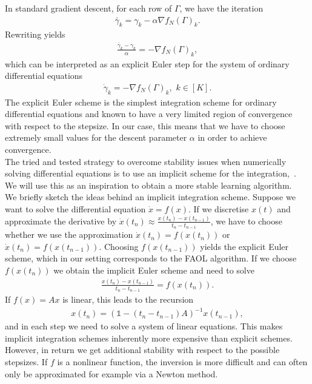 \documentclass[11pt, onecolumn, journal,compsoc]{IEEEtran}
\newcommand{\id}{\mathds{1}}
\theoremstyle{plain}
\theoremstyle{remark}
\begin{document}
In standard gradient descent, for each row of $\Gamma$, we have the iteration 
\begin{align}
\bar \gamma_k = \gamma_k -\alpha\nabla f_N(\Gamma)_k.
\end{align}
Rewriting yields \begin{align}\frac{\bar \gamma_k - \gamma_k}{\alpha}=-\nabla f_N(\Gamma)_k,\end{align}which can be interpreted as an explicit Euler step for the system of ordinary differential equations
\begin{align}\label{eq:EmpiricalODE}
\dot \gamma_k =  -\nabla f_N(\Gamma)_k,\,\, k\in[K].
\end{align}
The explicit Euler scheme is the simplest integration scheme for ordinary differential equations and known to have a very limited region of convergence with respect to the stepsize. In our case, this means that we have to choose extremely small values for the descent parameter $\alpha$ in order to achieve convergence.\\
%
The tried and tested strategy to overcome stability issues when numerically solving differential equations is to use an implicit scheme for the integration,~\cite{hairer1993Solving,hairer2010Solving}.
We will use this as an inspiration to obtain a more stable learning algorithm.\\
%
We briefly sketch the ideas behind an implicit integration scheme. Suppose we want to solve the differential equation $\dot x = f(x)$. If we discretise $x(t)$ and approximate the derivative by $\dot x(t_n) \approx \tfrac{x(t_n)-x(t_{n-1})}{t_n-t_{n-1}}$, we have to choose whether we use the approximation $\dot x(t_n) = f(x(t_n))$ or $\dot x(t_n) = f(x(t_{n-1}))$.
Choosing $f(x(t_{n-1}))$ yields the explicit Euler scheme, which in our setting corresponds to the FAOL algorithm. If we choose $f(x(t_{n}))$ we obtain the implicit Euler scheme and need to solve 
\begin{align}
\frac{x(t_n)-x(t_{n-1})}{t_n-t_{n-1}} = f(x(t_n)).
\end{align}
If $f(x) = Ax$ is linear, this leads to the recursion 
\begin{align}
x(t_n) = (\id -(t_n-t_{n-1})A)^{-1} x(t_{n-1}),
\end{align}
and in each step we need to solve a system of linear equations. This makes implicit integration schemes inherently more expensive than explicit schemes. However, in return we get additional stability with respect to the possible stepsizes. If $f$ is a nonlinear function, the inversion is more difficult and can often only be approximated for example via a Newton method.\\
\end{document}
